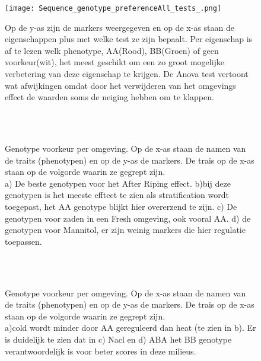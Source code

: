 \documentclass[12pt,a4paper]{article}
\begin{document}
\begin{figure}
\vspace{-9cm}
\texttt{[image: Sequence\_genotype\_preferenceAll\_tests\_.png]}
\caption[genotype voorkeuren bij alle tests]{Op de y-as zijn de markers weergegeven en op de x-as staan de eigenschappen plus met welke test ze zijn bepaalt. Per eigenschap is af te lezen welk phenotype, AA(Rood), BB(Groen) of geen voorkeur(wit), het meest geschikt om een zo groot mogelijke verbetering van deze eigenschap te krijgen. De Anova test vertoont wat afwijkingen omdat door het verwijderen van het omgevings effect de waarden soms de neiging hebben om te klappen.}
\end{figure}
\FloatBarrier
\begin{figure}
\vspace{-2cm}
\\
\\
\caption[genotype voorkeuren omgeving (Rood/Groen)]{Genotype voorkeur per omgeving. Op de x-as staan de namen van de traits (phenotypen) en op de y-as de markers. De trais op de x-as staan op de volgorde waarin ze gegrept zijn.\\
a) De beste genotypen voor het After Riping effect. b)bij deze genotypen is het meeste efftect te zien als stratification wordt toegepast, het AA genotype blijkt hier overerzend te zijn. c) De genotypen voor zaden in een Fresh omgeving, ook vooral AA. d) de genotypen voor Mannitol, er zijn weinig markers die hier regulatie toepassen.}
\end{figure}
\FloatBarrier
\begin{figure}
\vspace{-3.5cm}
\\
\\
\caption[genotype voorkeuren omgeving (overwegend Groen)]{Genotype voorkeur per omgeving. Op de x-as staan de namen van de traits (phenotypen) en op de y-as de markers. De trais op de x-as staan op de volgorde waarin ze gegrept zijn.\\ a)cold wordt minder door AA gereguleerd dan heat (te zien in b). Er is duidelijk te zien dat in c) Nacl en d) ABA het BB genotype verantwoordelijk is voor beter scores in deze milieus. }
\end{figure}
\end{document}
